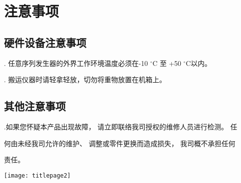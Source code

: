 \chapter{\heiti 注意事项}
\section{\heiti 硬件设备注意事项}
. 任意序列发生器的外界工作环境温度必须在-10 $^{\circ}$C 至 +50 $^{\circ}$C以内。

. 搬运仪器时请轻拿轻放，切勿将重物放置在机箱上。



%

\section{\heiti 其他注意事项}
.如果您怀疑本产品出现故障， 请立即联络我司授权的维修人员进行检测。 任

\hspace{-0.2cm}何由未经我司允许的维护、 调整或零件更换而造成损失， 我司概不承担任何

\hspace{-0.2cm}责任。


\newpage
\qquad

\newpage
\qquad
\thispagestyle{empty}

\newpage
\begin{center}
\texttt{[image: titlepage2]}
\end{center}

